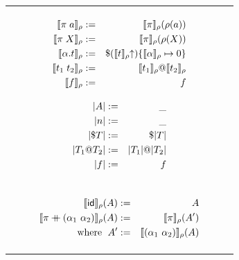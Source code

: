 \documentclass[english, mgr]{iithesis}
\begin{document}
\begin{figure}[htbp]
  \centering
  \begin{tabularx}{\textwidth}{|C|}
    \hline
    \begin{subfigure}{0.45\textwidth}
      \begin{eqnarray*}
        \llbracket \pi \; a \rrbracket_{\rho} & := &
          \llbracket \pi \rrbracket_{\rho}(\rho(a)) \\
        \llbracket \pi \; X \rrbracket_{\rho} & := &
          \llbracket \pi \rrbracket_{\rho}(\rho(X)) \\
        \llbracket \alpha. t \rrbracket_{\rho} & := &
          \$ (\llbracket t \rrbracket_{\rho} \kern-3pt \uparrow)
            \{\llbracket \alpha \rrbracket_{\rho}\mapsto0\} \\
        \llbracket t_1 \; t_2 \rrbracket_{\rho} & := &
          \llbracket t_1 \rrbracket_{\rho} @ \llbracket t_2 \rrbracket_{\rho} \\
        \llbracket f \rrbracket_{\rho} & := & f \\
      \end{eqnarray*}
    \end{subfigure}
    \begin{subfigure}{0.45\textwidth}
      \begin{eqnarray*}
        |A|                     & := & \_ \\
        |n|                            & := & \_ \\
        |\$ T|             & := & \$ |T| \\
        |T_1 @ T_2| & := &
          |T_1| @ |T_2| \\
        |f|                        & := & f \\
      \end{eqnarray*}
    \end{subfigure}
    \\ \vspace{-8mm}
    \begin{subfigure}{0.47\textwidth}
      \begin{eqnarray*}
        \permMdl{\permid}{\tmEnv}(\sematom) & := & \sematom \\
        \permMdl{\perm \++ \swap{\atomexp_1}{\atomexp_2}}{\tmEnv}(\sematom)   & := & \permMdl{\perm}{\tmEnv} (\sematom') \\
        \text{where }\; \sematom' & := &  \permMdl{\permswap{\atomexp_1}{\atomexp_2}{}}{\tmEnv}(\sematom)  \\

\end{eqnarray*}
\end{subfigure}
\end{tabularx}
\end{figure}
\end{document}
